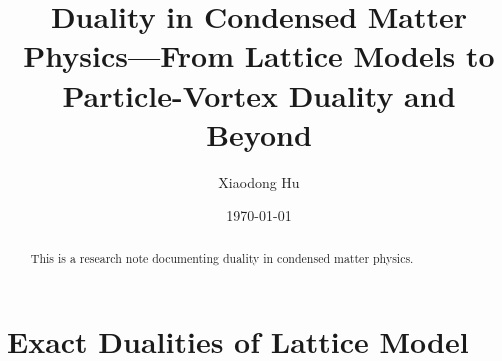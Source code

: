 \documentclass[10pt,nofootinbib]{revtex4}
\numberwithin{equation}{section}
\begin{document}
\title{Duality in Condensed Matter Physics---From Lattice Models to Particle-Vortex Duality and Beyond}%

\author{Xiaodong Hu}

\date{\today}


\begin{abstract}
	This is a research note documenting duality in condensed matter physics.
\end{abstract}
\maketitle
\tableofcontents
\section{Exact Dualities of Lattice Model}
\end{document}
